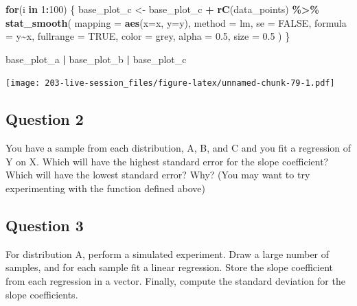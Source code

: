 \documentclass[
]{book}
\newenvironment{Shaded}{\begin{snugshade}}{\end{snugshade}}
\newcommand{\AttributeTok}[1]{\textcolor[rgb]{0.13,0.29,0.53}{#1}}
\newcommand{\ConstantTok}[1]{\textcolor[rgb]{0.56,0.35,0.01}{#1}}
\newcommand{\ControlFlowTok}[1]{\textcolor[rgb]{0.13,0.29,0.53}{\textbf{#1}}}
\newcommand{\DecValTok}[1]{\textcolor[rgb]{0.00,0.00,0.81}{#1}}
\newcommand{\FloatTok}[1]{\textcolor[rgb]{0.00,0.00,0.81}{#1}}
\newcommand{\FunctionTok}[1]{\textcolor[rgb]{0.13,0.29,0.53}{\textbf{#1}}}
\newcommand{\NormalTok}[1]{#1}
\newcommand{\OtherTok}[1]{\textcolor[rgb]{0.56,0.35,0.01}{#1}}
\newcommand{\SpecialCharTok}[1]{\textcolor[rgb]{0.81,0.36,0.00}{\textbf{#1}}}
\newcommand{\StringTok}[1]{\textcolor[rgb]{0.31,0.60,0.02}{#1}}
\theoremstyle{definition}
\theoremstyle{definition}
\theoremstyle{definition}
\theoremstyle{definition}
\theoremstyle{remark}
\begin{document}
\begin{Shaded}
\begin{Highlighting}[]
\ControlFlowTok{for}\NormalTok{(i }\ControlFlowTok{in} \DecValTok{1}\SpecialCharTok{:}\DecValTok{100}\NormalTok{) \{ }
\NormalTok{    base\_plot\_c }\OtherTok{\textless{}{-}}\NormalTok{ base\_plot\_c }\SpecialCharTok{+} \FunctionTok{rC}\NormalTok{(data\_points) }\SpecialCharTok{\%\textgreater{}\%} 
      \FunctionTok{stat\_smooth}\NormalTok{(}
        \AttributeTok{mapping =} \FunctionTok{aes}\NormalTok{(}\AttributeTok{x=}\NormalTok{x, }\AttributeTok{y=}\NormalTok{y), }
        \AttributeTok{method  =} \StringTok{\textquotesingle{}lm\textquotesingle{}}\NormalTok{,         }\AttributeTok{se =} \ConstantTok{FALSE}\NormalTok{, }
        \AttributeTok{formula =} \StringTok{\textquotesingle{}y\textasciitilde{}x\textquotesingle{}}\NormalTok{, }\AttributeTok{fullrange =} \ConstantTok{TRUE}\NormalTok{,}
        \AttributeTok{color   =} \StringTok{\textquotesingle{}grey\textquotesingle{}}\NormalTok{,    }\AttributeTok{alpha =} \FloatTok{0.5}\NormalTok{,}
        \AttributeTok{size    =} \FloatTok{0.5}
\NormalTok{      )}
\NormalTok{\}}

\NormalTok{base\_plot\_a }\SpecialCharTok{|}\NormalTok{ base\_plot\_b  }\SpecialCharTok{|}\NormalTok{ base\_plot\_c}
\end{Highlighting}
\end{Shaded}

\texttt{[image: 203-live-session\_files/figure-latex/unnamed-chunk-79-1.pdf]}

\hypertarget{question-2}{%
\subsection{Question 2}\label{question-2}}

You have a sample from each distribution, A, B, and C and you fit a regression of Y on X. Which will have the highest standard error for the slope coefficient? Which will have the lowest standard error? Why? (You may want to try experimenting with the function defined above)

\hypertarget{question-3}{%
\subsection{Question 3}\label{question-3}}

For distribution A, perform a simulated experiment. Draw a large number of samples, and for each sample fit a linear regression. Store the slope coefficient from each regression in a vector. Finally, compute the standard deviation for the slope coefficients.
\end{document}
